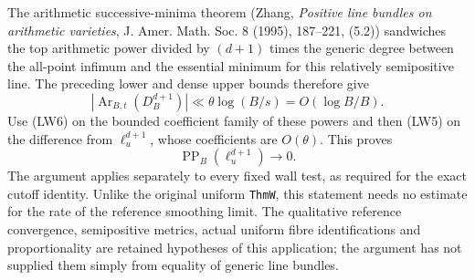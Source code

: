 The arithmetic successive-minima theorem (Zhang,
\emph{Positive line bundles on arithmetic varieties},
J. Amer. Math. Soc. 8 (1995), 187--221, (5.2)) sandwiches
the top arithmetic power divided by \((d+1)\) times the
generic degree between the all-point infimum and the
essential minimum for this relatively semipositive line.
The preceding lower and dense upper bounds therefore give
\[
             |\operatorname{Ar}_{B,t}(D_B^{d+1})|
                    \ll\theta\log(B/s)=O(\log B/B).
\]
Use (LW6) on the bounded coefficient family of these
powers and then (LW5) on the difference from \(\ell_u^{d+1}\),
whose coefficients are \(O(\theta)\). This proves
\[
                  \operatorname{PP}_B(\ell_u^{d+1})\longrightarrow0.
                                                               \tag{LW7}
\]
The argument applies separately to every fixed wall test,
as required for the exact cutoff identity. Unlike the
original uniform \texttt{ThmW}, this statement needs no
estimate for the rate of the reference smoothing limit.
The qualitative reference convergence, semipositive
metrics, actual uniform fibre identifications and
proportionality are retained hypotheses of this
application; the argument has not supplied them simply
from equality of generic line bundles.

